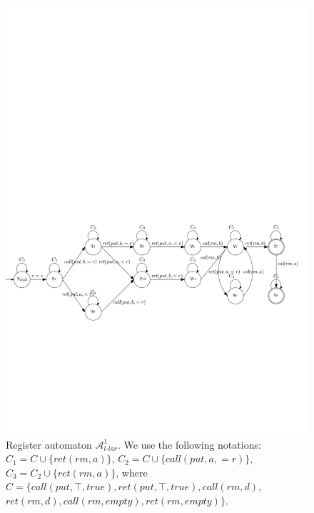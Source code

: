 \begin{figure}[htbp]
  \centering
  \includegraphics[width=1 \textwidth]{figures/PIC_AUTO_PQ1Lar-pprr.pdf}
  \caption{Register automaton $\mathcal{A}_{\textit{l-lar}}^1$. We use the following notations: $C_1 = C \cup \{ \textit{ret}(\textit{rm},a) \}$, $C_2 = C \cup \{ \textit{call}(\textit{put},a,=r) \}$, $C_3 = C_2 \cup \{ \textit{ret}(\textit{rm},a) \}$, where $C = \{ \textit{call}(\textit{put},\top,\textit{true}),\textit{ret}(\textit{put},\top,\textit{true}), \textit{call}(\textit{rm},d)$, $\textit{ret}(\textit{rm},d),\textit{call}(\textit{rm},\textit{empty}),\textit{ret}(\textit{rm},\textit{empty}) \}$.}
  \label{fig:automata APQ1Lar-1 in paper}
\end{figure}


